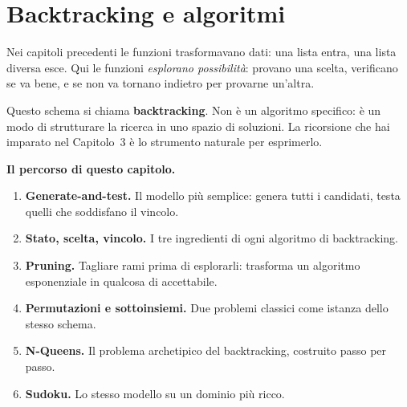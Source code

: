 
\chapter{Backtracking e algoritmi}

\begin{intuizione}
Nei capitoli precedenti le funzioni trasformavano dati:
una lista entra, una lista diversa esce.
Qui le funzioni \emph{esplorano possibilità}: provano una scelta,
verificano se va bene, e se non va tornano indietro
per provarne un'altra.

\medskip
Questo schema si chiama \textbf{backtracking}.
Non è un algoritmo specifico: è un modo di strutturare
la ricerca in uno spazio di soluzioni.
La ricorsione che hai imparato nel Capitolo~3 è lo strumento naturale
per esprimerlo.
\end{intuizione}

\begin{tcolorbox}[
  enhanced,
  colback=black!2, colframe=black!20,
  arc=3pt, boxrule=0.4pt,
  left=12pt, right=12pt, top=9pt, bottom=9pt,
  before skip=8pt, after skip=10pt
]
\small\color{black!65}

\textbf{Il percorso di questo capitolo.}

\medskip
\begin{enumerate}
  \item \textbf{Generate-and-test.} Il modello più semplice:
        genera tutti i candidati, testa quelli che soddisfano il vincolo.
  \item \textbf{Stato, scelta, vincolo.} I tre ingredienti di
        ogni algoritmo di backtracking.
  \item \textbf{Pruning.} Tagliare rami prima di esplorarli:
        trasforma un algoritmo esponenziale in qualcosa di accettabile.
  \item \textbf{Permutazioni e sottoinsiemi.} Due problemi classici
        come istanza dello stesso schema.
  \item \textbf{N-Queens.} Il problema archetipico del backtracking,
        costruito passo per passo.
  \item \textbf{Sudoku.} Lo stesso modello su un dominio più ricco.
\end{enumerate}
\end{tcolorbox}

